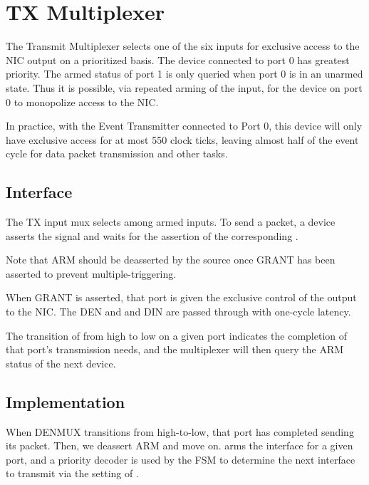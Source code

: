 
\section{TX Multiplexer}
The Transmit Multiplexer selects one of the six inputs for exclusive
access to the NIC output on a prioritized basis. The device connected
to port 0 has greatest priority. The armed status of port 1 is only
queried when port 0 is in an unarmed state. Thus it is possible, via
repeated arming of the input, for the device on port 0 to monopolize
access to the NIC.

In practice, with the Event Transmitter connected to Port 0, this
device will only have exclusive access for at most 550 clock ticks,
leaving almost half of the event cycle for data packet transmission
and other tasks.


\subsection{Interface}
The TX input mux selects among armed inputs. To send a packet, a
device asserts the  signal and waits for the assertion of
the corresponding .

Note that ARM should be deasserted by the source once GRANT has been
asserted to prevent multiple-triggering.

When GRANT is asserted, that port is given the exclusive control of
the output to the NIC. The DEN and and DIN are passed through with
one-cycle latency.

The transition of  from high to low on a given port
indicates the completion of that port's transmission needs, and the
multiplexer will then query the ARM status of the next device.



\subsection{Implementation}

When DENMUX transitions from high-to-low, that port has completed
sending its packet. Then, we deassert ARM and move on. 
arms the interface for a given port, and a priority decoder is used by
the FSM to determine the next interface to transmit via the setting of
.


